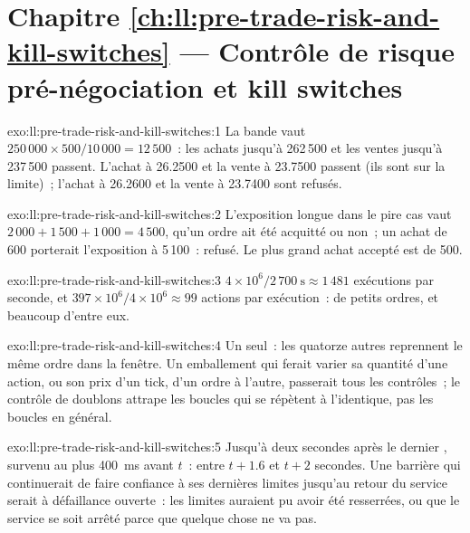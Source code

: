 \section*{Chapitre \ref{ch:ll:pre-trade-risk-and-kill-switches} --- Contrôle de risque pré-négociation et kill switches}

\begin{solution}{exo:ll:pre-trade-risk-and-kill-switches:1}
La bande vaut $250\,000 \times 500 / 10\,000 = 12\,500$~: les achats jusqu'à 262\,500 et les ventes jusqu'à 237\,500 passent. L'achat à 26.2500
et la vente à 23.7500 passent (ils sont sur la limite)~; l'achat à 26.2600 et la vente à 23.7400 sont refusés.
\end{solution}

\begin{solution}{exo:ll:pre-trade-risk-and-kill-switches:2}
L'exposition longue dans le pire cas vaut $2\,000 + 1\,500 + 1\,000 = 4\,500$, qu'un ordre ait été acquitté ou non~; un achat de
600 porterait l'exposition à 5\,100~: refusé. Le plus grand achat accepté est de 500.
\end{solution}

\begin{solution}{exo:ll:pre-trade-risk-and-kill-switches:3}
$4 \times 10^6 / 2\,700~\text{s} \approx 1\,481$ exécutions par seconde, et $397 \times 10^6 / 4 \times 10^6 \approx 99$ actions par
exécution~: de petits ordres, et beaucoup d'entre eux.
\end{solution}

\begin{solution}{exo:ll:pre-trade-risk-and-kill-switches:4}
Un seul~: les quatorze autres reprennent le même ordre dans la fenêtre. Un emballement qui ferait varier sa quantité d'une action, ou son prix d'un tick,
d'un ordre à l'autre, passerait tous les contrôles~; le contrôle de doublons attrape les boucles qui se répètent à l'identique, pas les boucles en général.
\end{solution}

\begin{solution}{exo:ll:pre-trade-risk-and-kill-switches:5}
Jusqu'à deux secondes après le dernier , survenu au plus \qty{400}{\milli\second} avant $t$~: entre $t + 1.6$ et
$t + 2$ secondes. Une barrière qui continuerait de faire confiance à ses dernières limites jusqu'au retour du service serait à défaillance ouverte~: les limites auraient pu
avoir été resserrées, ou que le service se soit arrêté parce que quelque chose ne va pas.
\end{solution}

